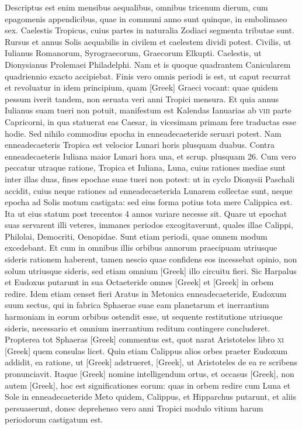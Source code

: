 Descriptus est enim mensibus aequalibus,
omnibus tricenum dierum, cum epagomenis appendicibus, quae
in communi anno sunt quinque, in embolimaeo sex.
Caelestis Tropicus,
cuius partes in naturalia Zodiaci segmenta tributae sunt.
Rursus
et annus Solis aequabilis in civilem et caelestem dividi potest.
Civilis,
ut Iulianus Romanorum, Syrograecorum, Graecorum Elkupti.
Caelestis,
ut Dionysianus Prolemaei Philadelphi.
Nam et is quoque quadrantem
Canicularem quadriennio exacto accipiebat.
Finis vero
omnis periodi is est, ut caput recurrat et revoluatur in idem principium,
quam \textgreek{[Greek]} Graeci vocant: quae quidem pessum iverit tandem,
non seruata veri anni Tropici mensura.
Et quia annus Iulianus
suam tueri non potuit, manifestum est Kalendas Ianuarias ab \textsc{viii}
parte Capricorni, in qua statuerat eas Caesar, in vicesimam primam
fere traductas esse hodie.
Sed nihilo commodius epocha in enneadecaeteride
seruari potest.
Nam enneadecaeteris Tropica est velocior
Lunari horis plusquam duabus.
Contra enneadecaeteris Iuliana
maior Lunari hora una, et scrup. plusquam 26.
Cum vero peccatur
utraque ratione, Tropica et Iuliana, Luna, cuius rationes mediae sunt
inter illas duas, fines epochae suae tueri non potest: ut in cyclo Dionysii
Paschali accidit, cuius neque rationes ad enneadecaeterida Lunarem
collectae sunt, neque epocha ad Solis motum castigata: sed eius
forma potius tota mere Calippica est.
Ita ut eius statum post trecentos
4 annos variare necesse sit.
Quare ut epochat suas servarent illi veteres,
immanes periodos excogitaverunt, quales illae Calippi, Philolai, Democriti,
Oenopidae.
Sunt etiam periodi, quae omnem modum excedebant.
Et cum in omnibus illis orbibus annorum praecipuam
utriusque sideris rationem haberent, tamen nescio quae confidens eos
incessebat opinio, non solum utriusque sideris, sed etiam omnium
\textgreek{[Greek]} illo circuitu fieri.
Sic Harpalus et Eudoxus putarunt
in sua Octaeteride omnes \textgreek{[Greek]}
 et \textgreek{[Greek]} in orbem redire.
Idem etiam censet fieri Aratus in Metonica enneadecaeteride, Eudoxum
suum sectus, qui in fabrica Sphaerae suae eam planetarum et inerrantium
harmoniam in eorum orbibus ostendit esse, ut sequente
restitutione utriusque sideris, necessario et omnium inerrantium reditum
contingere concluderet.
Propterea tot Sphaeras \textgreek{[Greek]} commentus
est, quot narat Aristoteles libro \textsc{xi} \textgreek{[Greek]} quem
consulas licet.
Quin etiam Calippus alios orbes praeter Eudoxum
addidit, ea ratione, ut \textgreek{[Greek]} adstrueret,
 \textgreek{[Greek]},
ut Aristoteles de ea re scribens pronunciavit.
Itaque \textgreek{[Greek]} nomine intelligendum ortus,
 et occasus \textgreek{[Greek]},
non autem \textgreek{[Greek]}, hoc est significationes
eorum: quas in orbem redire cum Luna et Sole in enneadecaeteride
Meto quidem, Calippus, et Hipparchus putarunt, et aliis
persuaserunt, donec deprehenso vero anni Tropici modulo vitium
harum periodorum castigatum est.

